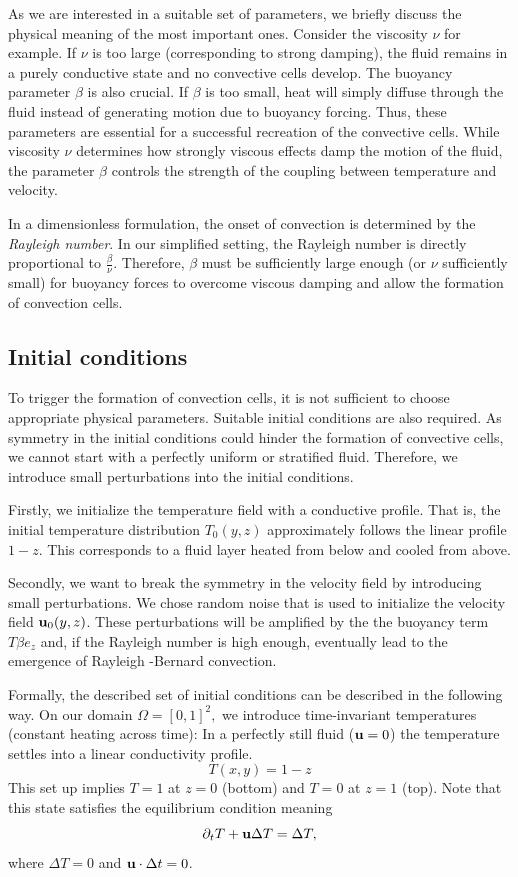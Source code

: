As we are interested in a suitable set of parameters, we briefly discuss
the physical meaning of the most important ones. Consider the viscosity
$\nu$ for example. If $\nu$ is too large (corresponding to strong
damping), the fluid remains in a purely conductive state and no convective
cells develop. The buoyancy parameter $\beta$ is also crucial. If $\beta$
is too small, heat will simply diffuse through the fluid instead of
generating motion due to buoyancy forcing. Thus, these parameters are
essential for a successful recreation of the convective cells. While
viscosity $\nu$ determines how strongly viscous effects damp the motion of
the fluid, the parameter $\beta$ controls the strength of the coupling
between temperature and velocity.

In a dimensionless formulation, the onset of convection is determined by
the \textit{Rayleigh number}. In our simplified setting, the Rayleigh
number is directly proportional to $\frac{\beta}{\nu}$. Therefore, $\beta$
must be sufficiently large enough (or $\nu$ sufficiently small) for
buoyancy forces to overcome viscous damping and allow the formation of
convection cells.

\subsection{Initial conditions}
To trigger the formation of convection cells, it is not sufficient to
choose appropriate physical parameters. Suitable initial conditions are
also required. As symmetry in the initial conditions could hinder the
formation of convective cells, we cannot start with a perfectly uniform or
stratified fluid. Therefore, we introduce small perturbations into the
initial conditions.

Firstly, we initialize the temperature field with a conductive profile.
That is, the initial temperature distribution $T_0(y,z)$ approximately
follows the linear profile $1-z.$ This corresponds to a fluid layer heated
from below and cooled from above.

Secondly, we want to break the symmetry in the velocity field by
introducing small perturbations. We chose random noise that is used to
initialize the velocity field $\textbf u_0(y,z)$. These perturbations will
be amplified by the the buoyancy term $T \beta e_z$ and, if the Rayleigh
number is high enough, eventually lead to the emergence of Rayleigh
-Bernard convection.

Formally, the described set of initial conditions can be described in the
following way. On our domain $\Omega=[0,1]^2,$ we introduce time-invariant
temperatures (constant heating across time): In a perfectly still fluid
($\textbf u=0$) the temperature settles into a linear conductivity
profile.
$$T(x,y)= 1-z$$
This set up implies $T=1$ at $z=0$ (bottom) and $T=0$ at $z=1$ (top).
Note that this state satisfies the equilibrium condition meaning 
$$
\partial _t T + \textbf u \Delta T = \Delta T,
$$
where $\Delta T=0$ and $\textbf u \cdot \Delta t=0$.

